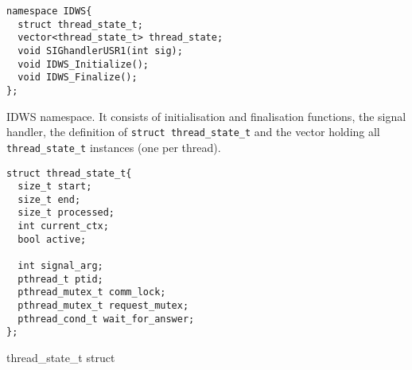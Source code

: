 \documentclass{acm_proc_article-sp}
\begin{document}
\begin{code}
\begin{lstlisting}
namespace IDWS{
  struct thread_state_t;
  vector<thread_state_t> thread_state;
  void SIGhandlerUSR1(int sig);
  void IDWS_Initialize();
  void IDWS_Finalize();
};
\end{lstlisting}
\caption{IDWS namespace. It consists of initialisation and finalisation 
functions, the signal handler, the definition of \texttt{struct 
thread\_state\_t} and the vector holding all \texttt{thread\_state\_t} 
instances (one per thread).}
\label{code:namespace}
\end{code}

\begin{code}
\begin{lstlisting}
struct thread_state_t{
  size_t start;
  size_t end;
  size_t processed;
  int current_ctx;
  bool active;

  int signal_arg;
  pthread_t ptid;
  pthread_mutex_t comm_lock;
  pthread_mutex_t request_mutex;
  pthread_cond_t wait_for_answer;
};
\end{lstlisting}
\caption{thread\_state\_t struct}
\label{code:thread}
\end{code}
\end{document}

